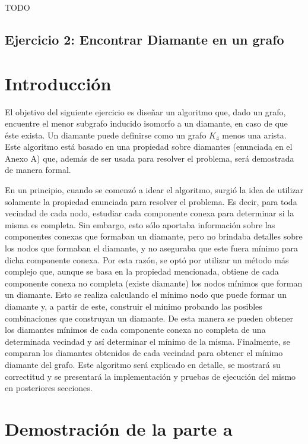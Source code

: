\documentclass[a4paper,11pt] {article}
\begin{document}
TODO

\bigskip

\begin{center}
\section*{Ejercicio 2: Encontrar Diamante en un grafo}
\end{center}

\bigskip
\section*{Introducci\'on}

El objetivo del siguiente ejercicio es dise\~{n}ar un algoritmo que, dado un grafo, encuentre el menor subgrafo inducido isomorfo a un diamante, en caso de que éste exista. Un diamante puede definirse como un grafo $K_{4}$ menos una arista. Este algoritmo está basado en una propiedad sobre diamantes (enunciada en el Anexo A) que, además de ser usada para resolver el problema, será demostrada de manera formal.

En un principio, cuando se comenzó a idear el algoritmo, surgió la idea de utilizar solamente la propiedad enunciada para resolver el problema. Es decir, para toda vecindad de cada nodo, estudiar cada componente conexa para determinar si la misma es completa. Sin embargo, esto sólo aportaba información sobre las componentes conexas que formaban un diamante, pero no brindaba detalles sobre los nodos que formaban el diamante, y no aseguraba que este fuera mínimo para dicha componente conexa. Por esta razón, se optó por utilizar un método más complejo que, aunque se basa en la propiedad mencionada, obtiene de cada componente conexa no completa (existe diamante) los nodos mínimos que forman un diamante. Esto se realiza calculando el mínimo nodo que puede formar un diamante y, a partir de este, construir el mínimo probando las posibles combinaciones que construyan un diamante. De esta manera se pueden obtener los diamantes mínimos de cada componente conexa no completa de una determinada vecindad y así determinar el mínimo de la misma. Finalmente, se comparan los diamantes obtenidos de cada vecindad para obtener el mínimo diamante del grafo. Este algoritmo será explicado en detalle, se mostrará su correctitud y se presentará la implementación y pruebas de ejecución del mismo en posteriores secciones.

\section*{Demostraci\'on de la parte a}
\end{document}
